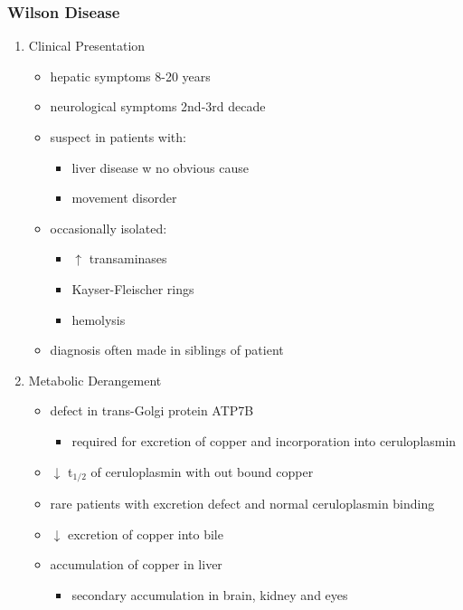 \documentclass{scrartcl}
\begin{document}
\subsubsection{Wilson Disease}
\label{sec:org967247f}
\begin{enumerate}
\item Clinical Presentation
\label{sec:orga6d613a}
\begin{itemize}
\item hepatic symptoms 8-20 years
\item neurological symptoms 2nd-3rd decade
\item suspect in patients with:
\begin{itemize}
\item liver disease w no obvious cause
\item movement disorder
\end{itemize}
\item occasionally isolated:
\begin{itemize}
\item \(\uparrow\) transaminases
\item Kayser-Fleischer rings
\item hemolysis
\end{itemize}
\item diagnosis often made in siblings of patient
\end{itemize}

\item Metabolic Derangement
\label{sec:org45d3cf4}
\begin{itemize}
\item defect in trans-Golgi protein ATP7B
\begin{itemize}
\item required for excretion of copper and incorporation into ceruloplasmin
\end{itemize}
\item \(\downarrow\) t\(_{\text{1/2}}\) of ceruloplasmin with out bound copper
\item rare patients with excretion defect and normal ceruloplasmin binding
\item \(\downarrow\) excretion of copper into bile
\item accumulation of copper in liver
\begin{itemize}
\item secondary accumulation in brain, kidney and eyes
\end{itemize}
\end{itemize}


\end{enumerate}
\end{document}

